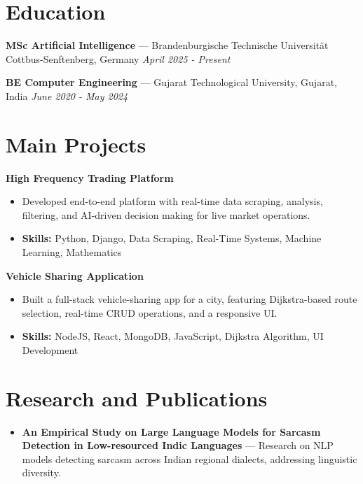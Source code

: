 \documentclass[a4paper,10pt]{article}
\begin{document}
\section*{Education}
\textbf{MSc Artificial Intelligence} — Brandenburgische Technische Universität Cottbus-Senftenberg, Germany \hfill \textit{April 2025 - Present}\par
\vspace{1.5pt}
\textbf{BE Computer Engineering} — Gujarat Technological University, Gujarat, India \hfill \textit{June 2020 - May 2024}\par

\section*{Main Projects}
\textbf{High Frequency Trading Platform}\par
\vspace{1pt}
\begin{itemize}
  \item Developed end-to-end platform with real-time data scraping, analysis, filtering, and AI-driven decision making for live market operations.
  \item \textbf{Skills:} Python, Django, Data Scraping, Real-Time Systems, Machine Learning, Mathematics
\end{itemize}
\vspace{3pt}
\textbf{Vehicle Sharing Application}\par
\vspace{1pt}
\begin{itemize}
  \item Built a full-stack vehicle-sharing app for a city, featuring Dijkstra-based route selection, real-time CRUD operations, and a responsive UI.
  \item \textbf{Skills:} NodeJS, React, MongoDB, JavaScript, Dijkstra Algorithm, UI Development
\end{itemize}

\section*{Research and Publications}
\begin{itemize}
\item \textbf{An Empirical Study on Large Language Models for Sarcasm Detection in Low-resourced Indic Languages} — Research on NLP models detecting sarcasm across Indian regional dialects, addressing linguistic diversity.
\end{itemize}
\end{document}
